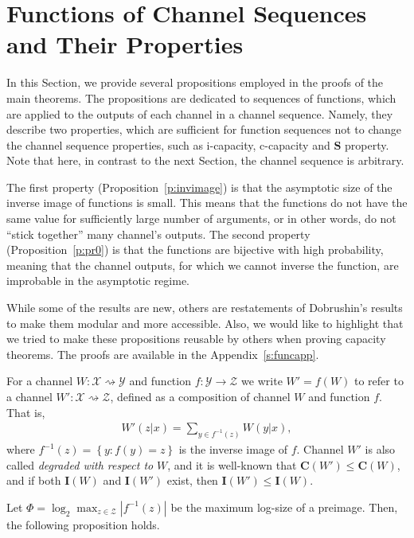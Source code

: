 \documentclass[journal, twocol]{IEEEtran}
\newcommand{\bfC}{{\mathbf{C}}}
\newcommand{\bfI}{{\mathbf{I}}}
\newcommand{\bfS}{{\mathbf{S}}}
\newcommand{\mX}{{\mathcal{X}}}
\newcommand{\mY}{{\mathcal{Y}}}
\newcommand{\mZ}{{\mathcal{Z}}}
\newcommand{\abs}[1]{\left|{#1}\right|}
\newcommand{\set}[1]{{\left\{{#1}\right\}}}
\newcommand{\tosq}{\rightsquigarrow}
\begin{document}

\section{Functions of Channel Sequences and Their Properties}
\label{s:funcseq}

In this Section, we provide several propositions employed in the proofs of the main theorems. 
The propositions are dedicated to sequences of functions, which are applied to the outputs of each channel in a channel sequence.
Namely, they describe two properties, which are sufficient for function sequences not to change the channel sequence properties, such as i-capacity, c-capacity and $\bfS$ property.
Note that here, in contrast to the next Section, the channel sequence is arbitrary.

The first property (Proposition~\ref{p:invimage}) is that the asymptotic size of the inverse image of functions is small.
This means that the functions do not have the same value for sufficiently large number of arguments, or in other words, do not ``stick together'' many channel's outputs.
The second property (Proposition~\ref{p:pr0}) is that the functions are bijective with high probability, meaning that the channel outputs, for which we cannot inverse the function, are  improbable in the asymptotic regime.

While some of the results are new, others are restatements of Dobrushin's results to make them modular and more accessible.
Also, we would like to highlight that we tried to make these propositions reusable by others when proving capacity theorems.
The proofs are available in the Appendix~\ref{s:funcapp}.

For a channel $W:\mX\tosq\mY$ and function $f:\mY\to\mZ$ we write $W'=f(W)$ to refer to a channel $W':\mX\tosq\mZ$, defined as a composition of channel $W$ and function $f$.
That is,
\begin{align}
W'(z|x)=\sum_{y\in f^{-1}(z)}W(y|x),
\label{eq:fw}
\end{align}
where $f^{-1}(z)=\set{y:f(y)=z}$ is the inverse image of $f$.
Channel $W'$ is also called \emph{degraded with respect to} $W$, and it is well-known that $\bfC(W')\leq\bfC(W)$, and if both $\bfI(W)$ and $\bfI(W')$ exist, then $\bfI(W') \leq \bfI(W)$.

Let $\Phi=\log_2\max_{z\in \mZ}\abs{f^{-1}(z)}$ be the maximum log-size of a preimage.
Then, the following proposition holds.
\end{document}
